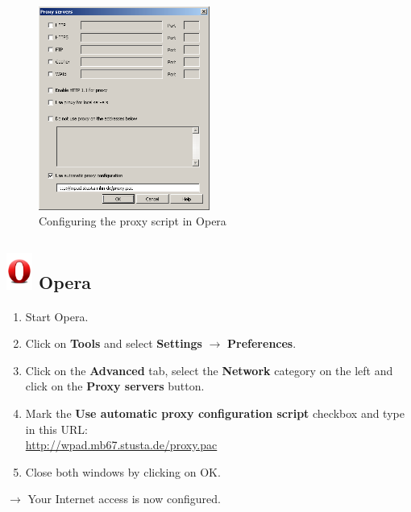 \documentclass[a4paper,12pt]{scrartcl}
\newcommand{\optemph}[1]{\textbf{#1}}
\begin{document}
\newpage
\begin{figure}
  \begin{center}
    \includegraphics[width=0.5\textwidth,keepaspectratio]{Bilder/Proxy_Opera_EN}
  \end{center}
  \caption{Configuring the proxy script in Opera}
\end{figure}

\subsection*{\includegraphics[height=1.2cm,keepaspectratio]{Bilder/Opera_O} Opera}
\begin{enumerate}
    \item Start Opera.
	\item Click on \optemph{Tools} and select \optemph{Settings} $\rightarrow$ \optemph{Preferences}.
	\item Click on the \optemph{Advanced} tab, select the \optemph{Network} category on the left and click on the \optemph{Proxy servers} button.
	\item Mark the \optemph{Use automatic proxy configuration script} checkbox and type in this URL: \\ \url{http://wpad.mb67.stusta.de/proxy.pac}
    \item Close both windows by clicking on OK.
\end{enumerate}
$\rightarrow$ Your Internet access is now configured.
\end{document}
